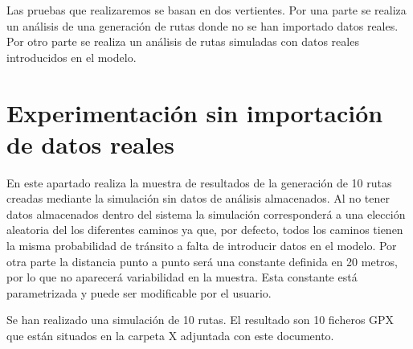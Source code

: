 Las pruebas que realizaremos se basan en dos vertientes. Por una parte se realiza un análisis de una 
generación de rutas donde no se han importado datos reales. Por otro parte se realiza un análisis de 
rutas simuladas con datos reales introducidos en el modelo.


\section{Experimentación sin importación de datos reales}
En este apartado realiza la muestra de resultados de la generación de 10 rutas creadas 
mediante la simulación sin datos de análisis almacenados. Al no tener datos almacenados dentro del 
sistema la simulación corresponderá a una elección aleatoria del los diferentes caminos ya que, por 
defecto, todos los caminos tienen la misma probabilidad de tránsito a falta de introducir datos en el 
modelo. Por otra parte la distancia punto a punto será una constante definida en 20 metros, por lo 
que no aparecerá variabilidad en la muestra. Esta constante está parametrizada y puede ser 
modificable por el usuario.

Se han realizado una simulación de 10 rutas. El resultado son 10 ficheros \ac{GPX} que están situados en la carpeta X adjuntada con este documento.

